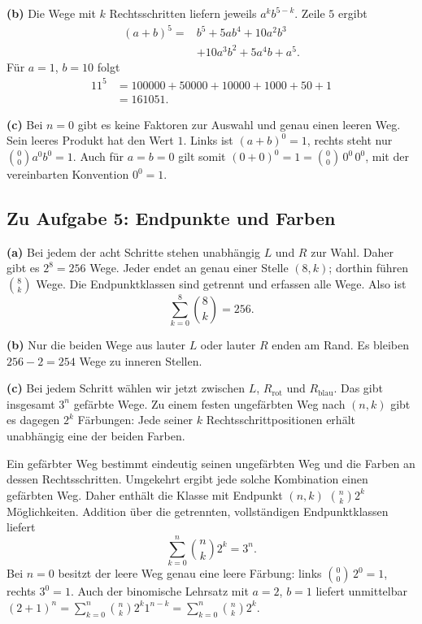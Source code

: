 \textbf{(b)} Die Wege mit $k$ Rechtsschritten liefern jeweils
$a^kb^{5-k}$. Zeile $5$ ergibt
\[
 \begin{aligned}
 (a+b)^5={}&b^5+5ab^4+10a^2b^3\\
           &+10a^3b^2+5a^4b+a^5.
 \end{aligned}
\]
Für $a=1$, $b=10$ folgt
\[
 \begin{aligned}
 11^5&=100000+50000+10000+1000+50+1\\
     &=161051.
 \end{aligned}
\]

\textbf{(c)} Bei $n=0$ gibt es keine Faktoren zur Auswahl und genau
einen leeren Weg. Sein leeres Produkt hat den Wert $1$. Links ist
$(a+b)^0=1$, rechts steht nur $\binom00a^0b^0=1$.
Auch für $a=b=0$ gilt somit $(0+0)^0=1=\binom00\,0^0\,0^0$,
mit der vereinbarten Konvention $0^0=1$.

\subsection*{Zu Aufgabe 5: Endpunkte und Farben}
\textbf{(a)} Bei jedem der acht Schritte stehen unabhängig $L$ und
$R$ zur Wahl. Daher gibt es $2^8=256$ Wege. Jeder endet an genau einer
Stelle $(8,k)$; dorthin führen $\binom8k$ Wege. Die Endpunktklassen
sind getrennt und erfassen alle Wege. Also ist
\[
 \sum_{k=0}^8\binom8k=256.
\]

\textbf{(b)} Nur die beiden Wege aus lauter $L$ oder lauter $R$ enden
am Rand. Es bleiben $256-2=254$ Wege zu inneren Stellen.

\textbf{(c)} Bei jedem Schritt wählen wir jetzt zwischen
$L$, $R_{\mathrm{rot}}$ und $R_{\mathrm{blau}}$. Das gibt insgesamt
$3^n$ gefärbte Wege. Zu einem festen ungefärbten Weg nach $(n,k)$
gibt es dagegen $2^k$ Färbungen: Jede seiner $k$ Rechtsschrittpositionen
erhält unabhängig eine der beiden Farben.

Ein gefärbter Weg bestimmt eindeutig seinen ungefärbten Weg und die
Farben an dessen Rechtsschritten. Umgekehrt ergibt jede solche Kombination
einen gefärbten Weg. Daher enthält die Klasse mit Endpunkt $(n,k)$
$\binom nk2^k$ Möglichkeiten. Addition über die getrennten, vollständigen
Endpunktklassen liefert
\[
 \sum_{k=0}^n\binom nk2^k=3^n.
\]
Bei $n=0$ besitzt der leere Weg genau eine leere Färbung:
links $\binom00\,2^0=1$, rechts $3^0=1$.
Auch der binomische Lehrsatz mit $a=2$, $b=1$ liefert unmittelbar
$(2+1)^n=\sum_{k=0}^n\binom nk2^k1^{n-k}=\sum_{k=0}^n\binom nk2^k$.

